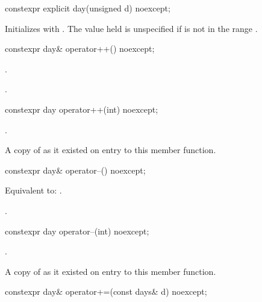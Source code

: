 %
\begin{itemdecl}
constexpr explicit day(unsigned d) noexcept;
\end{itemdecl}

\begin{itemdescr}
\pnum
\effects
Initializes  with .
The value held is unspecified if  is not in the range .
\end{itemdescr}

%
\begin{itemdecl}
constexpr day& operator++() noexcept;
\end{itemdecl}

\begin{itemdescr}
\pnum
\effects
{}.

\pnum
\returns
{}.
\end{itemdescr}

%
\begin{itemdecl}
constexpr day operator++(int) noexcept;
\end{itemdecl}

\begin{itemdescr}
\pnum
\effects
{}.

\pnum
\returns
A copy of  as it existed on entry to this member function.
\end{itemdescr}

%
\begin{itemdecl}
constexpr day& operator--() noexcept;
\end{itemdecl}

\begin{itemdescr}
\pnum
\effects
Equivalent to: .

\pnum
\returns
{}.
\end{itemdescr}

%
\begin{itemdecl}
constexpr day operator--(int) noexcept;
\end{itemdecl}

\begin{itemdescr}
\pnum
\effects
{}.

\pnum
\returns
A copy of  as it existed on entry to this member function.
\end{itemdescr}

%
\begin{itemdecl}
constexpr day& operator+=(const days& d) noexcept;
\end{itemdecl}

